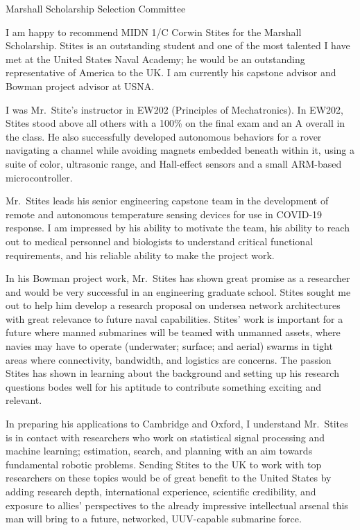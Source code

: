 \documentclass[10pt]{wrceletter}
\date{\today}
\begin{document}
\begin{letter}{%
Marshall Scholarship Selection Committee}

\opening{}
\raggedright %
\setlength{\parindent}{15pt} %
I am happy to recommend MIDN 1/C Corwin Stites for the Marshall Scholarship.  Stites is an outstanding student and one of the most talented I have met at the United States Naval Academy; he would be an outstanding representative of America to the UK. I am currently his capstone advisor and Bowman project advisor at USNA. 

I was Mr.~Stite's instructor in EW202 (Principles of Mechatronics).  In EW202, Stites stood above all others with a 100\% on the final exam and an A overall in the class. He also successfully developed autonomous behaviors for a rover navigating a channel while avoiding magnets embedded beneath within it, using a suite of color, ultrasonic range, and Hall-effect sensors and a small ARM-based microcontroller. 

Mr.~Stites leads his senior engineering capstone team in the development of remote and autonomous temperature sensing devices for use in COVID-19 response. I am impressed by his ability to motivate the team, his ability to reach out to medical personnel and biologists to understand critical functional requirements, and his reliable ability to make the project work. 

In his Bowman project work, Mr.~Stites has shown great promise as a researcher and would be very successful in an engineering graduate school. Stites sought me out to help him develop a research proposal on undersea network architectures with great relevance to future naval capabilities. Stites' work is important for a future where manned submarines will be teamed with unmanned assets, where navies may have to operate (underwater; surface; and aerial) swarms in tight areas where connectivity, bandwidth, and logistics are concerns. The passion Stites has shown in learning about the background and setting up his research questions bodes well for his aptitude to contribute something exciting and relevant. 

In preparing his applications to Cambridge and Oxford, I understand Mr.~Stites is in contact with researchers who work on statistical signal processing and machine learning; estimation, search, and planning with an aim towards fundamental robotic problems. Sending Stites to the UK to work with top researchers on these topics would be of great benefit to the United States by adding research depth, international experience, scientific credibility, and exposure to allies' perspectives to the already impressive intellectual arsenal this man will bring to a future, networked, UUV-capable submarine force. 

\closing{~} %

\end{letter}
\end{document}
